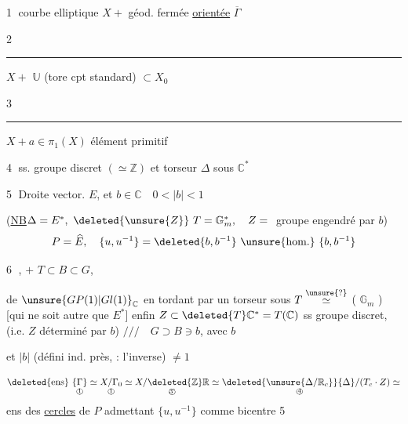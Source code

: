 
\textcircled{1} courbe elliptique $X+$ géod. fermée \uline{orientée} $\overline\Gamma$ 

\textcircled{2} \rule{1.6cm}{0.25pt} $X+$  $\mathbb U$ (tore cpt standard) $\subset X_0$

\textcircled{3} \rule{1cm}{0.25pt} $X+a\in\pi_1(X)$ élément primitif

\textcircled{4} ss. groupe discret $(\simeq\mathbb Z)$ 
 et torseur $\Delta$ sous $\mathbb C^*$ 

\textcircled{5} Droite vector.  $E$,   et $b\in\mathbb C\quad0<|b|<1$

(\uline{NB}\quad $\Delta=E^*,\ \deleted{\unsure{Z}}\ T=\mathbb G_{m}^*,\quad Z={}$ groupe engendré par $b$)
\[
P=\widehat E,\quad \{u,u^{-1}\}=\deleted{b,b^{-1}}\ \text{\unsure{hom.}}\ \{b,b^{-1}\}
\]

\textcircled{6} , $+$    $T\subset B\subset G$,  


de $\unsure{GP(1)|Gl(1)}_{\mathbb C}$ en tordant par un torseur sous $T\overset{\unsure{\mathrm{?}}}{\simeq}$ ( $\mathbb G_m$ )  [qui ne soit autre que $E^*$] enfin $Z\subset\deleted{T}\mathbb C^*=T(\mathbb C)$ ss groupe discret, (i.e. $Z$ déterminé par $b$) \quad $///\quad G\supset B\ni b$, avec $b$ 

et $|b|$ (défini ind. près,  : l'inverse) $\ne1$

\[
\deleted{\text{ens}}\ \underset{\text{\textcircled{1}}}{\{\Gamma\}}
\simeq\underset{\text{\textcircled{1}}}{X/\Gamma_0}
\simeq\underset{\text{\textcircled{3'}}}{X/\deleted{\mathbb Z}\mathbb R}
\simeq\deleted{\underset{\text{\textcircled{4}}}{\unsure{\Delta/\mathbb R_c}}}
{\Delta}/{(T_c\cdot Z)}
\simeq
\]
ens des \uline{cercles} de $P$  admettant $\{u,u^{-1}\}$ comme bicentre \textcircled{5}
